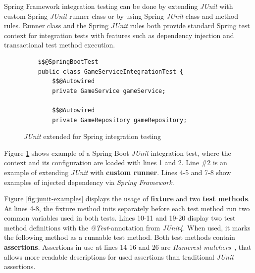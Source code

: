     Spring Framework integration testing can be done by extending \textit{JUnit} with custom Spring \textit{JUnit} runner class or by using Spring \textit{JUnit} class and
    method rules. Runner class and the Spring \textit{JUnit} rules both provide standard Spring test context
    for integration tests with features such as dependency injection and transactional test method execution. ~\cite{springintegration}

    \begin{figure}[ht]
        \begin{lstlisting}[style=java]
    %%@RunWith%%(SpringJUnit4ClassRunner.class)
    $$@SpringBootTest
    public class GameServiceIntegrationTest {
        $$@Autowired
        private GameService gameService;

        $$@Autowired
        private GameRepository gameRepository;
        \end{lstlisting}
        \caption{\textit{JUnit} extended for Spring integration testing}
        \label{fig:springrunner}
    \end{figure}

    Figure \ref{fig:springrunner} shows example of a Spring Boot \textit{JUnit} integration test, where the context and its configuration are
    loaded with lines 1 and 2. Line \#2 is an example of extending \textit{JUnit} with \textbf{custom runner}. Lines 4-5 and 7-8 show
    examples of injected dependency via \textit{Spring Framework}.

    Figure \ref{fig:junit-examples} displays the usage of \textbf{fixture} and two \textbf{test methods}. At lines 4-8, the fixture method
    inits separately before each test method run two common variables used in both tests. Lines 10-11 and 19-20 display two test method definitions with the
    \textit{@Test}-annotation from \textit{JUnit4}. When used, it marks the following method as a runnable test method. Both test methods
    contain \textbf{assertions}. Assertions in use at lines 14-16 and 26 are \textit{Hamcrest matchers}~\cite{hamcrest}, that
    allows more readable descriptions for used assertions than traditional \textit{JUnit} assertions.

